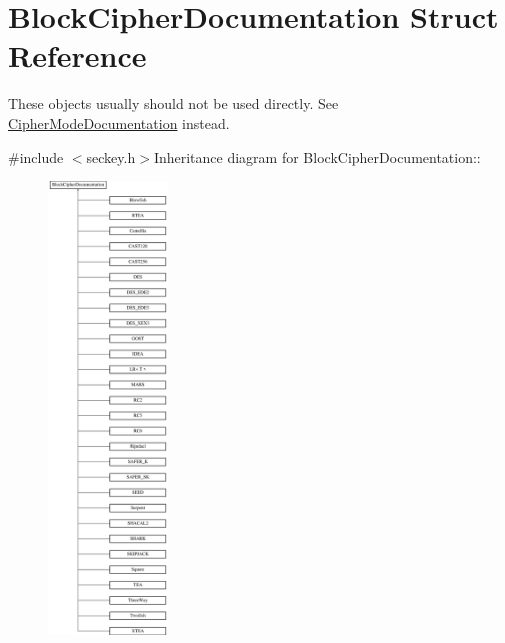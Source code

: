 \hypertarget{struct_block_cipher_documentation}{
\section{BlockCipherDocumentation Struct Reference}
\label{struct_block_cipher_documentation}
}


These objects usually should not be used directly. See \hyperlink{struct_cipher_mode_documentation}{CipherModeDocumentation} instead.  


{\ttfamily \#include $<$seckey.h$>$}Inheritance diagram for BlockCipherDocumentation::\begin{figure}[H]
\begin{center}
\leavevmode
\includegraphics[height=12cm]{struct_block_cipher_documentation}
\end{center}
\end{figure}
